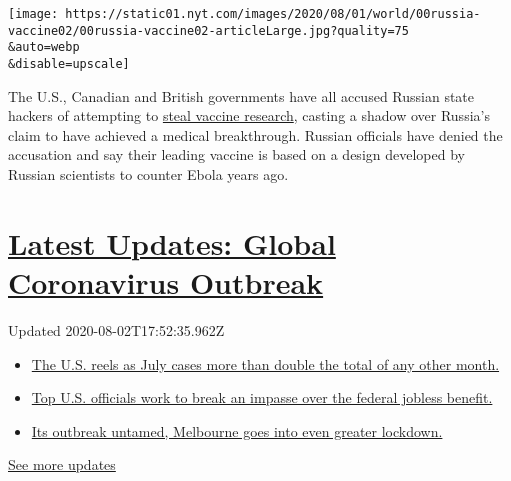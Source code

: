 \texttt{[image: https://static01.nyt.com/images/2020/08/01/world/00russia-vaccine02/00russia-vaccine02-articleLarge.jpg?quality=75\\\&auto=webp\\\&disable=upscale]}

The U.S., Canadian and British governments have all accused Russian
state hackers of attempting to
\href{https://www.nytimes.com/2020/07/16/us/politics/vaccine-hacking-russia.html}{steal
vaccine research}, casting a shadow over Russia's claim to have achieved
a medical breakthrough. Russian officials have denied the accusation and
say their leading vaccine is based on a design developed by Russian
scientists to counter Ebola years ago.

\hypertarget{latest-updates-global-coronavirus-outbreak}{%
\section{\texorpdfstring{\href{https://www.nytimes.com/2020/08/01/world/coronavirus-covid-19.html?action=click\&pgtype=Article\&state=default\&region=MAIN_CONTENT_1\&context=storylines_live_updates}{Latest
Updates: Global Coronavirus
Outbreak}}{Latest Updates: Global Coronavirus Outbreak}}\label{latest-updates-global-coronavirus-outbreak}}

Updated 2020-08-02T17:52:35.962Z

\begin{itemize}
\tightlist
\item
  \href{https://www.nytimes.com/2020/08/01/world/coronavirus-covid-19.html?action=click\&pgtype=Article\&state=default\&region=MAIN_CONTENT_1\&context=storylines_live_updates\#link-34047410}{The
  U.S. reels as July cases more than double the total of any other
  month.}
\item
  \href{https://www.nytimes.com/2020/08/01/world/coronavirus-covid-19.html?action=click\&pgtype=Article\&state=default\&region=MAIN_CONTENT_1\&context=storylines_live_updates\#link-780ec966}{Top
  U.S. officials work to break an impasse over the federal jobless
  benefit.}
\item
  \href{https://www.nytimes.com/2020/08/01/world/coronavirus-covid-19.html?action=click\&pgtype=Article\&state=default\&region=MAIN_CONTENT_1\&context=storylines_live_updates\#link-2bc8948}{Its
  outbreak untamed, Melbourne goes into even greater lockdown.}
\end{itemize}

\href{https://www.nytimes.com/2020/08/01/world/coronavirus-covid-19.html?action=click\&pgtype=Article\&state=default\&region=MAIN_CONTENT_1\&context=storylines_live_updates}{See
more updates}

